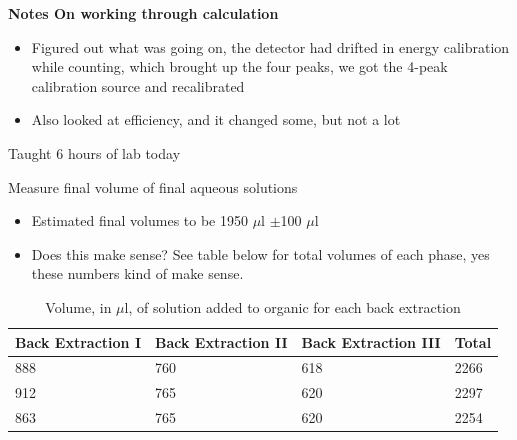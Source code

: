 \documentclass[idxtotoc,hyperref,openany,oneside]{labbook} %
\newcommand{\cmark}{\ding{51}}%
\newcommand{\done}{\rlap{$\square$}{\raisebox{2pt}{\large\hspace{1pt}\cmark}}%
  \hspace{-2.5pt}}
\begin{document}



\textbf{Notes On working through calculation}
\begin{itemize}
\item{Figured out what was going on, the detector had drifted in energy
  calibration while counting, which brought up the four peaks, we got the
  4-peak calibration source and recalibrated}
\item{Also looked at efficiency, and it changed some, but not a lot}
\end{itemize}


Taught 6 hours of lab today




\begin{todolist}
\item[\done]{Measure final volume of final aqueous solutions}
  \begin{itemize}
  \item{Estimated final volumes to be 1950 $\mu$l $\pm$100 $\mu$l}
  \item{Does this make sense? See table below for total volumes of each phase,
  yes these numbers kind of make sense.}
  \end{itemize}
\end{todolist}

\begin{table}[H]
\caption{Volume, in $\mu$l, of solution added to organic for each back extraction}
\begin{tabular}{l l l l}
\toprule
\textbf{Back Extraction I} & \textbf{Back Extraction II} & \textbf{Back Extraction III}
& \textbf{Total}\\
\toprule
888 & 760 & 618 & 2266\\
912 & 765 & 620 & 2297\\
863 & 765 & 620 & 2254\\
\bottomrule
\end{tabular}
\label{tab:treatments_xy}
\end{table}
\end{document}
